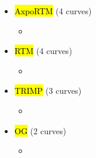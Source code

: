 \begin{itemize}
\begin{itemize}
\begin{itemize}
                    \item APG (AU)
                    \item ELES (SI\footnote{Slovenia})
                    \item HTSO (GR)
                \end{itemize}
        \end{itemize}
    \item \hl{AxpoRTM} (4 curves)
        \begin{itemize}
            \item 
        \end{itemize}
    \item \hl{RTM} (4 curves)
        \begin{itemize}
            \item 
        \end{itemize}
    \item \hl{TRIMP} (3 curves)
        \begin{itemize}
            \item 
        \end{itemize}
    \item \hl{OG} (2 curves)
        \begin{itemize}
            \item 
        \end{itemize}
\end{itemize}